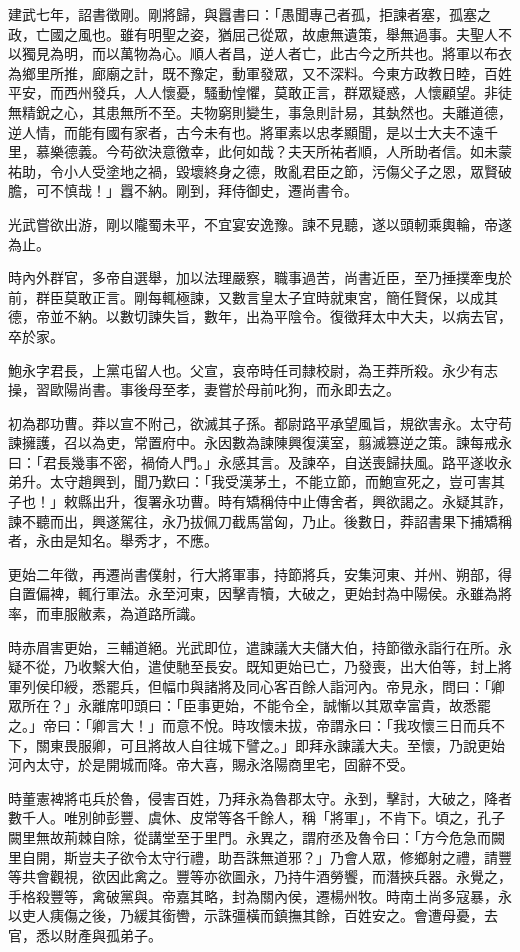 \begin{pinyinscope}
建武七年，詔書徵剛。剛將歸，與囂書曰：「愚聞專己者孤，拒諫者塞，孤塞之政，亡國之風也。雖有明聖之姿，猶屈己從眾，故慮無遺策，舉無過事。夫聖人不以獨見為明，而以萬物為心。順人者昌，逆人者亡，此古今之所共也。將軍以布衣為鄉里所推，廊廟之計，既不豫定，動軍發眾，又不深料。今東方政教日睦，百姓平安，而西州發兵，人人懷憂，騷動惶懼，莫敢正言，群眾疑惑，人懷顧望。非徒無精銳之心，其患無所不至。夫物窮則變生，事急則計易，其埶然也。夫離道德，逆人情，而能有國有家者，古今未有也。將軍素以忠孝顯聞，是以士大夫不遠千里，慕樂德義。今苟欲決意徼幸，此何如哉？夫天所祐者順，人所助者信。如未蒙祐助，令小人受塗地之禍，毀壞終身之德，敗亂君臣之節，污傷父子之恩，眾賢破膽，可不慎哉！」囂不納。剛到，拜侍御史，遷尚書令。

光武嘗欲出游，剛以隴蜀未平，不宜宴安逸豫。諫不見聽，遂以頭軔乘輿輪，帝遂為止。

時內外群官，多帝自選舉，加以法理嚴察，職事過苦，尚書近臣，至乃捶撲牽曳於前，群臣莫敢正言。剛每輒極諫，又數言皇太子宜時就東宮，簡任賢保，以成其德，帝並不納。以數切諫失旨，數年，出為平陰令。復徵拜太中大夫，以病去官，卒於家。

鮑永字君長，上黨屯留人也。父宣，哀帝時任司隸校尉，為王莽所殺。永少有志操，習歐陽尚書。事後母至孝，妻嘗於母前叱狗，而永即去之。

初為郡功曹。莽以宣不附己，欲滅其子孫。都尉路平承望風旨，規欲害永。太守苟諫擁護，召以為吏，常置府中。永因數為諫陳興復漢室，翦滅篡逆之策。諫每戒永曰：「君長幾事不密，禍倚人門。」永感其言。及諫卒，自送喪歸扶風。路平遂收永弟升。太守趙興到，聞乃歎曰：「我受漢茅土，不能立節，而鮑宣死之，豈可害其子也！」敕縣出升，復署永功曹。時有矯稱侍中止傳舍者，興欲謁之。永疑其詐，諫不聽而出，興遂駕往，永乃拔佩刀截馬當匈，乃止。後數日，莽詔書果下捕矯稱者，永由是知名。舉秀才，不應。

更始二年徵，再遷尚書僕射，行大將軍事，持節將兵，安集河東、并州、朔部，得自置偏裨，輒行軍法。永至河東，因擊青犢，大破之，更始封為中陽侯。永雖為將率，而車服敝素，為道路所識。

時赤眉害更始，三輔道絕。光武即位，遣諫議大夫儲大伯，持節徵永詣行在所。永疑不從，乃收繫大伯，遣使馳至長安。既知更始已亡，乃發喪，出大伯等，封上將軍列侯印綬，悉罷兵，但幅巾與諸將及同心客百餘人詣河內。帝見永，問曰：「卿眾所在？」永離席叩頭曰：「臣事更始，不能令全，誠慚以其眾幸富貴，故悉罷之。」帝曰：「卿言大！」而意不悅。時攻懷未拔，帝謂永曰：「我攻懷三日而兵不下，關東畏服卿，可且將故人自往城下譬之。」即拜永諫議大夫。至懷，乃說更始河內太守，於是開城而降。帝大喜，賜永洛陽商里宅，固辭不受。

時董憲裨將屯兵於魯，侵害百姓，乃拜永為魯郡太守。永到，擊討，大破之，降者數千人。唯別帥彭豐、虞休、皮常等各千餘人，稱「將軍」，不肯下。頃之，孔子闕里無故荊棘自除，從講堂至于里門。永異之，謂府丞及魯令曰：「方今危急而闕里自開，斯豈夫子欲令太守行禮，助吾誅無道邪？」乃會人眾，修鄉射之禮，請豐等共會觀視，欲因此禽之。豐等亦欲圖永，乃持牛酒勞饗，而潛挾兵器。永覺之，手格殺豐等，禽破黨與。帝嘉其略，封為關內侯，遷楊州牧。時南土尚多寇暴，永以吏人痍傷之後，乃緩其銜轡，示誅彊橫而鎮撫其餘，百姓安之。會遭母憂，去官，悉以財產與孤弟子。


\end{pinyinscope}
